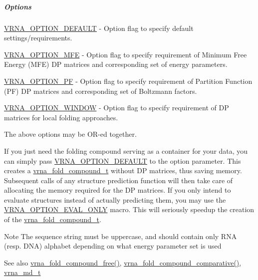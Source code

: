 \subparagraph*{Options}


\begin{DoxyItemize}
\item \mbox{\hyperlink{group__fold__compound_gacea5b7ee6181c485f36e2afa0e9089e4}{V\+R\+N\+A\+\_\+\+O\+P\+T\+I\+O\+N\+\_\+\+D\+E\+F\+A\+U\+LT}} -\/ Option flag to specify default settings/requirements.
\item \mbox{\hyperlink{group__fold__compound_gae63be9127fe7dcc1f9bb14f5bb1064ee}{V\+R\+N\+A\+\_\+\+O\+P\+T\+I\+O\+N\+\_\+\+M\+FE}} -\/ Option flag to specify requirement of Minimum Free Energy (M\+FE) DP matrices and corresponding set of energy parameters.
\item \mbox{\hyperlink{group__fold__compound_gabfbadcddda3e74ce7f49035ef8f058f7}{V\+R\+N\+A\+\_\+\+O\+P\+T\+I\+O\+N\+\_\+\+PF}} -\/ Option flag to specify requirement of Partition Function (PF) DP matrices and corresponding set of Boltzmann factors.
\item \mbox{\hyperlink{group__fold__compound_ga2b2a8009ccdccc3eb1571556261aee8e}{V\+R\+N\+A\+\_\+\+O\+P\+T\+I\+O\+N\+\_\+\+W\+I\+N\+D\+OW}} -\/ Option flag to specify requirement of DP matrices for local folding approaches.
\end{DoxyItemize}

The above options may be O\+R-\/ed together.

If you just need the folding compound serving as a container for your data, you can simply pass \mbox{\hyperlink{group__fold__compound_gacea5b7ee6181c485f36e2afa0e9089e4}{V\+R\+N\+A\+\_\+\+O\+P\+T\+I\+O\+N\+\_\+\+D\+E\+F\+A\+U\+LT}} to the {\ttfamily option} parameter. This creates a \mbox{\hyperlink{group__fold__compound_ga1b0cef17fd40466cef5968eaeeff6166}{vrna\+\_\+fold\+\_\+compound\+\_\+t}} without DP matrices, thus saving memory. Subsequent calls of any structure prediction function will then take care of allocating the memory required for the DP matrices. If you only intend to evaluate structures instead of actually predicting them, you may use the \mbox{\hyperlink{group__fold__compound_ga61469c423131552c8483229f8b6c7e0e}{V\+R\+N\+A\+\_\+\+O\+P\+T\+I\+O\+N\+\_\+\+E\+V\+A\+L\+\_\+\+O\+N\+LY}} macro. This will seriously speedup the creation of the \mbox{\hyperlink{group__fold__compound_ga1b0cef17fd40466cef5968eaeeff6166}{vrna\+\_\+fold\+\_\+compound\+\_\+t}}.

\begin{DoxyNote}{Note}
The sequence string must be uppercase, and should contain only R\+NA (resp. D\+NA) alphabet depending on what energy parameter set is used
\end{DoxyNote}
\begin{DoxySeeAlso}{See also}
\mbox{\hyperlink{group__fold__compound_ga576a077b418a9c3650e06f8e5d296fc2}{vrna\+\_\+fold\+\_\+compound\+\_\+free()}}, \mbox{\hyperlink{group__fold__compound_gad6bacc816af274922b13d947f708aa0c}{vrna\+\_\+fold\+\_\+compound\+\_\+comparative()}}, \mbox{\hyperlink{group__model__details_ga1f8a10e12a0a1915f2a4eff0b28ea17c}{vrna\+\_\+md\+\_\+t}}
\end{DoxySeeAlso}

